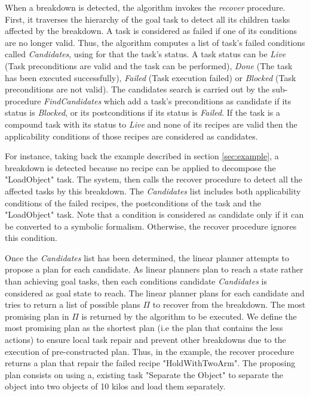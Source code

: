 \documentclass[conference]{IEEEtran}
\begin{document}
	\par When a breakdown is detected, the algorithm invokes the \textit{recover} procedure. First, it traverses the hierarchy of the goal task to detect all its children tasks affected by the breakdown. A task is considered as failed if one of its conditions are no longer valid. Thus, the algorithm computes a list of task's failed conditions called \textit{Candidates}, using for that the task's status. A task status can be \textit{Live} (Task preconditions are valid and the task can be performed), \textit{ Done} (The task has been executed successfully),  \textit{Failed} (Task execution failed) or \textit{Blocked}  (Task preconditions are not valid). The candidates search is carried out by the sub-procedure \textit{FindCandidates}  which add a task's preconditions as candidate if its status is  \textit{Blocked}, or its postconditions if its status is \textit{Failed}.	 If the task is a compound task with its status to \textit{Live} and none of its recipes are valid then the applicability conditions of those recipes are considered as candidates.

	For instance, taking back the example described in  section \ref{sec:example}, a breakdown is detected because no recipe can be applied to decompose the "LoadObject" task. The system, then calls the recover procedure to detect all the affected tasks by this breakdown. The \textit{Candidates} list includes both applicability conditions of the failed recipes, the postconditions of the task and the "LoadObject" task. Note that a condition is considered as candidate only if it can be converted to a symbolic formalism. Otherwise, the recover procedure ignores this condition. 
	
	\par Once the \textit{Candidates} list has been determined, the linear planner attempts to propose a plan for each candidate. As linear planners plan to reach a state rather than achieving goal tasks, then each conditions candidate \textit{Candidates}  is considered as goal state to reach.  The linear planner plans  for each candidate and tries to return a list of possible plans $\Pi$ to recover from the breakdown. The most promising plan in $\Pi$  is returned by the algorithm to be executed. We define the most promising plan as the shortest plan (i.e the plan that contains the less actions) to ensure local task repair and prevent other breakdowns due to the execution of pre-constructed plan. Thus, in the example, the recover procedure returns a plan that repair the failed recipe "HoldWithTwoArm". The proposing plan  consists on using a, existing task "Separate the Object" to separate the object into two objects of 10 kilos and load them separately.
	
\end{document}
